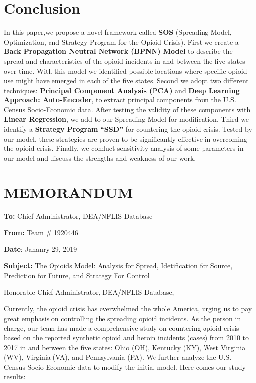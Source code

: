 \documentclass{mcmthesis}
\begin{document}
\section{Conclusion} \label{Sec-Conclusion}
In this paper,we propose a novel framework called \textbf{SOS} (Spreading Model, Optimization, and Strategy Program for the Opioid Crisis). First we create a \textbf{Back Propagation Neutral Network  (BPNN) Model} to describe the spread and characteristics of the opioid incidents in and between the five states over time. With this model we identified possible locations where specific opioid use might have emerged in each of the five states. Second we adopt two different techniques: \textbf{Principal Component Analysis (PCA)} and \textbf{Deep Learning Approach: Auto-Encoder}, to extract principal components from the U.S. Census Socio-Economic data. After testing the validity of these components with \textbf{Linear Regression},  we add to our Spreading Model for modification. Third we identify a \textbf{Strategy Program ``SSD''} for countering the opioid crisis. Tested by our model, these strategies are proven to be significantly effective in overcoming the opioid crisis. Finally, we conduct sensitivity analysis of some parameters in our model and discuss the strengths and weakness of our work.

\newpage
\section*{MEMORANDUM} 

\noindent\textbf{To:} Chief Administrator, DEA/NFLIS Database

\noindent\textbf{From:} Team \# 1920446

\noindent\textbf{Date}: Jananry 29, 2019

\noindent\textbf{Subject:} The Opioids Model: Analysis for Spread, Idetification for Source, Prediction for Future, and Strategy For Control

Honorable Chief Administrator, DEA/NFLIS Database, 

Currently, the opioid crisis has overwhelmed the whole America, urging us to pay great emphasis on controlling the spreading opioid incidents. As the person in charge, our team has made a comprehensive study on countering opioid crisis based on the reported synthetic opioid and heroin incidents (cases) from 2010 to 2017 in and between the five states: Ohio (OH), Kentucky (KY), West Virginia (WV), Virginia (VA), and Pennsylvania (PA). We further analyze the U.S. Census Socio-Economic data to modify the initial model. Here comes our study results:
\end{document}
